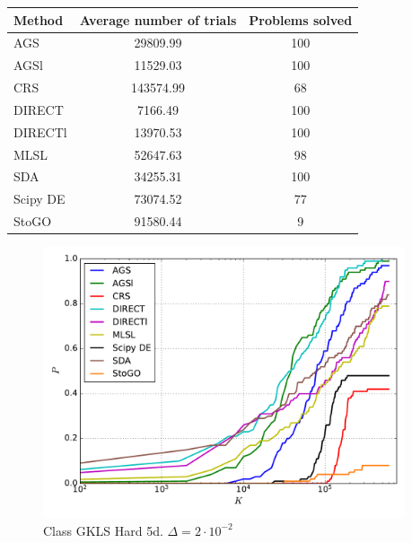 \documentclass[a4paper]{article}
\begin{document}
\begin{tabular}{lcc}
\hline
 Method   &  Average number of trials  &  Problems solved  \\
\hline
 AGS      &          29809.99          &        100        \\
 AGSl     &          11529.03          &        100        \\
 CRS      &         143574.99          &        68         \\
 DIRECT   &          7166.49           &        100        \\
 DIRECTl  &          13970.53          &        100        \\
 MLSL     &          52647.63          &        98         \\
 SDA      &          34255.31          &        100        \\
 Scipy DE &          73074.52          &        77         \\
 StoGO    &          91580.44          &         9         \\
\hline
\end{tabular}
\begin{figure}[H]
  \center
  \includegraphics[width=0.95\textwidth]{../experiments/gklsh5d/cmc.pdf}
  \caption{Class GKLS Hard 5d. $\Delta=2\cdot10^{-2}$}
\end{figure}
\end{document}
